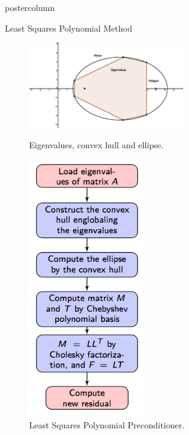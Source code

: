 \documentclass{beamer}
\begin{document}
\begin{frame}
\begin{columns}
\begin{column}{.33\textwidth}
\begin{beamercolorbox}[center]{postercolumn}
\begin{minipage}{.98\textwidth}
{\begin{myblock}{Least Squares Polynomial Method}
						\begin{figure}
							\begin{minipage}{0.6\textwidth}
								\centering\includegraphics[width=0.6\textwidth]{img/polygon.eps}
								\caption{Eigenvalues, convex hull and ellipse.}
								\label{fig:fail}
							\end{minipage}
							\hspace{0.6em}
							\begin{minipage}{0.31\textwidth}
								\centering\includegraphics[width=0.44\textwidth]{img/lsqr.png}
								\caption{Least Squares Polynomial Preconditioner.}
								\label{fig:fail}
							\end{minipage}
						\end{figure}
					\end{myblock}

}
\end{minipage}
\end{beamercolorbox}
\end{column}
\end{columns}
\end{frame}
\end{document}
